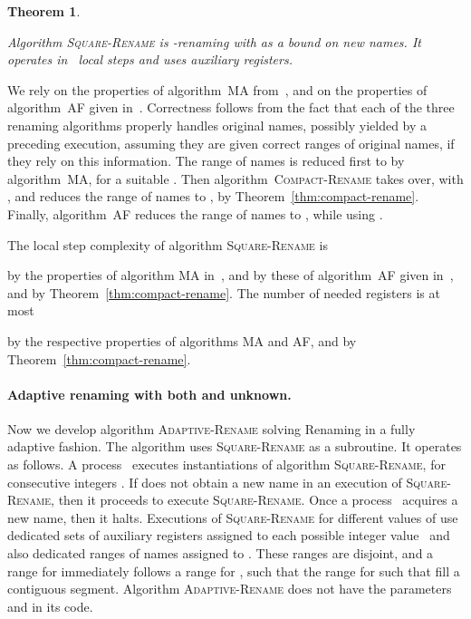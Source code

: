 \documentclass[11pt]{article}
\newcommand{\BBB}{\vspace*{-\bigskipamount}}
\newcommand{\Paragraph}[1]{\BBB\paragraph{#1}}
\newcommand{\qed}{\hfill  \smallbreak}
\newenvironment{proof}{\noindent{\bf Proof:}}{\qed}
\newtheorem{theorem}{Theorem}
\begin{document}
\begin{theorem}
\label{thm:square-rename}

Algorithm \textsc{Square-Rename} is -renaming with  as a bound on new names.
It operates  in~ local steps and uses  auxiliary registers.
\end{theorem}

\begin{proof}
We rely on the properties of algorithm~\textsc{MA} from~\cite{MoirA95}, and on the properties of  algorithm~\textsc{AF} given in~\cite{AttiyaF01}.
Correctness follows from the fact that each of the three renaming algorithms properly handles original names, possibly yielded by a preceding execution, assuming they are given correct  ranges of original names, if they rely on  this information.
The range of names is reduced first  to  by algorithm~\textsc{MA}, for a suitable .
Then algorithm~\textsc{Compact-Rename} takes over, with , and reduces the range of names to , by Theorem~\ref{thm:compact-rename}. 
Finally, algorithm~\textsc{AF} reduces the range of names to , while using .


The local step complexity of algorithm \textsc{Square-Rename} is  

by the properties of  algorithm \textsc{MA} in~\cite{MoirA95}, and by these of  algorithm~\textsc{AF} given in~\cite{AttiyaF01}, and by Theorem~\ref{thm:compact-rename}.
The number of needed registers is at most

by the respective properties of algorithms \textsc{MA} and \textsc{AF}, and by Theorem~\ref{thm:compact-rename}.
\end{proof}




\Paragraph{Adaptive renaming with both  and  unknown.}



Now we develop algorithm \textsc{Adaptive-Rename} solving Renaming  in a fully adaptive fashion.
The algorithm uses \textsc{Square-Rename} as a subroutine.
It operates as follows.
A process~ executes instantiations of algorithm \textsc{Square-Rename}, for consecutive integers . 
If  does not obtain a new name in an execution of \textsc{Square-Rename}, then it proceeds to execute \textsc{Square-Rename}.
Once a process~ acquires a new name, then it halts.
Executions of \textsc{Square-Rename} for different values of  use dedicated sets of auxiliary registers assigned to each possible integer value~ and also dedicated ranges of names assigned to .
These ranges are disjoint, and a range for  immediately follows a range for , such that the range for  such that  fill a contiguous segment.
Algorithm \textsc{Adaptive-Rename} does  not have the parameters  and  in its code.
\end{document}
